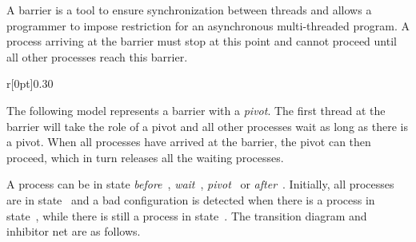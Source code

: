 A barrier is a tool to ensure synchronization between threads and
allows a programmer to impose restriction for an asynchronous
multi-threaded program.
%
A process arriving at the barrier must stop at this point and cannot
proceed until all other processes reach this barrier.

\begin{wrapfigure}{r}[0pt]{0.30\linewidth}
  \hfill%
\end{wrapfigure}
%
The following model represents a barrier with a \emph{pivot}. The
first thread at the barrier will take the role of a pivot and all
other processes wait as long as there is a pivot. When all processes
have arrived at the barrier, the pivot can then proceed, which in turn
releases all the waiting processes.

A process can be in state \emph{before}~,
\emph{wait}~, \emph{pivot}~ or
\emph{after}~. %
%
Initially, all processes are in state~ and a bad configuration
is detected when there is a process in state~, while there is
still a process in state~.
%
The transition diagram and inhibitor net are as follows.

